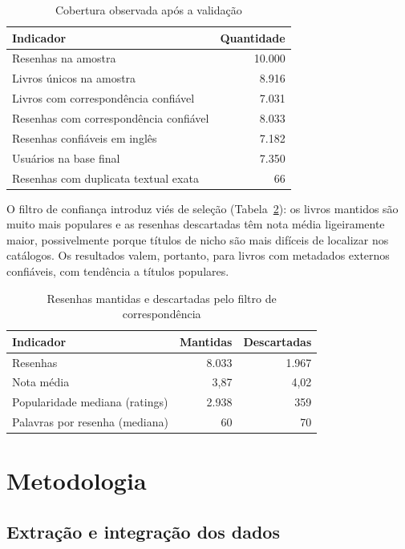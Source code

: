 \documentclass[conference]{IEEEtran}
\begin{document}
\begin{table}[!t]
\caption{Cobertura observada após a validação}
\label{tab:cobertura}
\centering
\begin{tabular}{lr}
\toprule
\textbf{Indicador} & \textbf{Quantidade}\\
\midrule
Resenhas na amostra & 10.000\\
Livros únicos na amostra & 8.916\\
Livros com correspondência confiável & 7.031\\
Resenhas com correspondência confiável & 8.033\\
Resenhas confiáveis em inglês & 7.182\\
Usuários na base final & 7.350\\
Resenhas com duplicata textual exata & 66\\
\bottomrule
\end{tabular}
\end{table}


O filtro de confiança introduz viés de seleção (Tabela~\ref{tab:selecao}): os
livros mantidos são muito mais populares e as resenhas descartadas têm nota
média ligeiramente maior, possivelmente porque títulos de nicho são mais
difíceis de localizar nos catálogos. Os resultados valem, portanto, para livros
com metadados externos confiáveis, com tendência a títulos populares.

\FloatBarrier
\begin{table}[!t]
\caption{Resenhas mantidas e descartadas pelo filtro de correspondência}
\label{tab:selecao}
\centering
\begin{tabular}{lrr}
\toprule
\textbf{Indicador} & \textbf{Mantidas} & \textbf{Descartadas}\\
\midrule
Resenhas & 8.033 & 1.967\\
Nota média & 3,87 & 4,02\\
Popularidade mediana (ratings) & 2.938 & 359\\
Palavras por resenha (mediana) & 60 & 70\\
\bottomrule
\end{tabular}
\end{table}

\section{Metodologia}

\subsection{Extração e integração dos dados}
\end{document}
